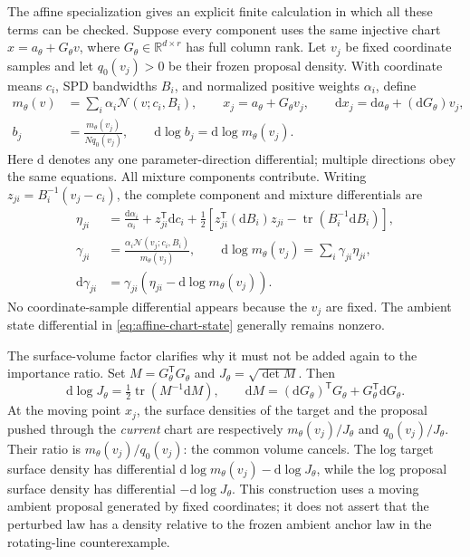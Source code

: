 \documentclass[11pt]{article}
\newcommand{\R}{\mathbb{R}}
\newcommand{\dd}{\mathrm{d}}
\begin{document}
The affine specialization gives an explicit finite calculation in which all
these terms can be checked.  Suppose every component uses the same injective
chart $x=a_\theta+G_\theta v$, where $G_\theta\in\R^{d\times r}$ has full
column rank.  Let $v_j$ be fixed coordinate samples and let $q_0(v_j)>0$
be their frozen proposal density.  With coordinate means $c_i$, SPD
bandwidths $B_i$, and normalized positive weights $\alpha_i$, define
\begin{align}
 m_\theta(v)&=\sum_i\alpha_i\mathcal N(v;c_i,B_i),\qquad
 x_j=a_\theta+G_\theta v_j,\qquad
 \dd x_j=\dd a_\theta+(\dd G_\theta)v_j,
 \label{eq:affine-chart-state}\\
 b_j&=\frac{m_\theta(v_j)}{Nq_0(v_j)},\qquad
 \dd\log b_j=\dd\log m_\theta(v_j).
 \label{eq:affine-chart-iwsg}
\end{align}
Here $\dd$ denotes any one parameter-direction differential; multiple
directions obey the same equations.  All mixture components contribute.
Writing $z_{ji}=B_i^{-1}(v_j-c_i)$, the complete component and mixture
differentials are
\begin{align}
 \eta_{ji}&=\frac{\dd\alpha_i}{\alpha_i}
       +z_{ji}^{\mathsf T}\dd c_i
       +\frac12\left[z_{ji}^{\mathsf T}(\dd B_i)z_{ji}
                     -\operatorname{tr}(B_i^{-1}\dd B_i)\right],\\
 \gamma_{ji}&=\frac{\alpha_i\mathcal N(v_j;c_i,B_i)}{m_\theta(v_j)},\qquad
 \dd\log m_\theta(v_j)=\sum_i\gamma_{ji}\eta_{ji},\\
 \dd\gamma_{ji}&=\gamma_{ji}
                  \left(\eta_{ji}-\dd\log m_\theta(v_j)\right).
 \label{eq:affine-chart-mixture-differential}
\end{align}
No coordinate-sample differential appears because the $v_j$ are fixed.
The ambient state differential in \eqref{eq:affine-chart-state} generally
remains nonzero.

The surface-volume factor clarifies why it must not be added again to the
importance ratio.  Set $M=G_\theta^\mathsf{T}G_\theta$ and
$J_\theta=\sqrt{\det M}$.  Then
\begin{equation}
 \dd\log J_\theta=\tfrac12\operatorname{tr}(M^{-1}\dd M),\qquad
 \dd M=(\dd G_\theta)^\mathsf{T}G_\theta
                 +G_\theta^\mathsf{T}\dd G_\theta.
 \label{eq:affine-chart-volume}
\end{equation}
At the moving point $x_j$, the surface densities of the target and the
proposal pushed through the \emph{current} chart are respectively
$m_\theta(v_j)/J_\theta$ and $q_0(v_j)/J_\theta$.  Their ratio is
$m_\theta(v_j)/q_0(v_j)$: the common volume cancels.  The log target surface
density has differential $\dd\log m_\theta(v_j)-\dd\log J_\theta$, while
the log proposal surface density has differential $-\dd\log J_\theta$.
This construction uses a moving ambient proposal generated by fixed
coordinates; it does not assert that the perturbed law has a density relative
to the frozen ambient anchor law in the rotating-line counterexample.
\end{document}
